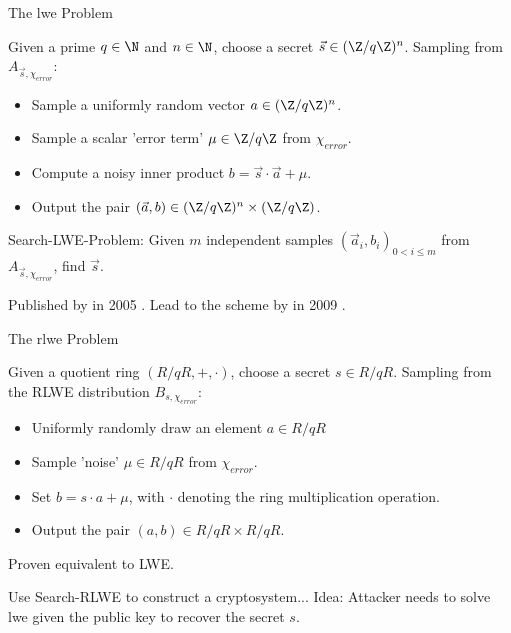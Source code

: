 \begin{frame}{The \gls{lwe} Problem}
  \begin{definition}
    Given a prime $q \in \N$ and $n \in \N$, choose a secret $\vec{s} \in (\Z / q \Z)^n$.
    Sampling from $A_{\vec{s}, \chi_{error}}$:
    \begin{itemize}
      \item Sample a uniformly random vector $a \in (\Z/q\Z)^n$.
      \item Sample a scalar 'error term' $\mu \in \Z / q \Z$ from $\chi_{error}$.
      \item Compute a noisy inner product $b = \vec{s} \cdot \vec{a} + \mu$.
      \item Output the pair $(\vec{a}, b) \in (\Z / q \Z)^n \times (\Z / q \Z)$.
    \end{itemize}
  \end{definition}

  Search-LWE-Problem:
  Given $m$ independent samples $(\vec{a}_i, b_i)_{0 < i \leq m}$ from $A_{\vec{s}, \chi_{error}}$, find $\vec{s}$.

  Published by  in 2005 \cite{2005-lwe-original}.
  Lead to the  scheme by  in 2009 \cite{2009-gentry-fhe-original}.
\end{frame}

\begin{frame}{The \gls{rlwe} Problem}
  \begin{definition}
    Given a quotient ring $(R/qR, +, \cdot)$, choose a secret $s \in R/qR$.
    Sampling from the RLWE distribution $B_{s, \chi_{error}}$:
    \begin{itemize}
      \item Uniformly randomly draw an element $a \in R/qR$
      \item Sample 'noise' $\mu \in R/qR$ from $\chi_{error}$.
      \item Set $b = s \cdot a + \mu$, with $\cdot$ denoting the ring multiplication operation.
      \item Output the pair $(a, b) \in R/qR \times R/qR$.
    \end{itemize}
  \end{definition}

  Proven equivalent to LWE.

  Use Search-RLWE to construct a cryptosystem...
  Idea: Attacker needs to solve \gls{lwe} given the public key to recover the secret $s$.
\end{frame}

